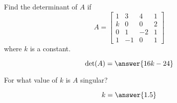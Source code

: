 \documentclass{ximera}
\author{}
\begin{document}
\begin{exercise}
Find the determinant of $A$ if 
$$A=\begin{bmatrix}1 & 3 & 4 & 1\\k & 0 & 0 & 2\\0 & 1 & -2 & 1\\1 & -1 & 0 & 1\end{bmatrix}$$
where $k$ is a constant.

$$\mbox{det}(A)=\answer{16k-24}$$

For what value of $k$ is $A$ singular?

$$k=\answer{1.5}$$


 \end{exercise}
 
\end{document}
